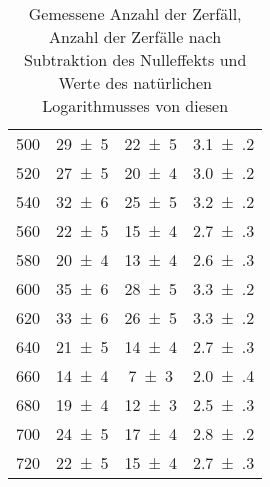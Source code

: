 \begin{table}[!h]
\begin{tabular}{|r|c|c|c|}
		\num{500} & \num{29(5)} & \num{22(5)} & \num{3.1(2)}\\
		\num{520} & \num{27(5)} & \num{20(4)} & \num{3.0(2)}\\
		\num{540} & \num{32(6)} & \num{25(5)} & \num{3.2(2)}\\
		\num{560} & \num{22(5)} & \num{15(4)} & \num{2.7(3)}\\
		\num{580} & \num{20(4)} & \num{13(4)} & \num{2.6(3)}\\
		\num{600} & \num{35(6)} & \num{28(5)} & \num{3.3(2)}\\
		\num{620} & \num{33(6)} & \num{26(5)} & \num{3.3(2)}\\
		\num{640} & \num{21(5)} & \num{14(4)} & \num{2.7(3)}\\
		\num{660} & \num{14(4)} & \num{7(3)} & \num{2.0(4)}\\
		\num{680} & \num{19(4)} & \num{12(3)} & \num{2.5(3)}\\
		\num{700} & \num{24(5)} & \num{17(4)} & \num{2.8(2)}\\
		\num{720} & \num{22(5)} & \num{15(4)} & \num{2.7(3)}\\
		\hline
	\end{tabular}
	\caption{Gemessene Anzahl der Zerfäll, Anzahl der Zerfälle nach Subtraktion des Nulleffekts und Werte des natürlichen Logarithmusses von diesen \label{tab:Auswertung_Messwerte_Rhodium}}
\end{table}
